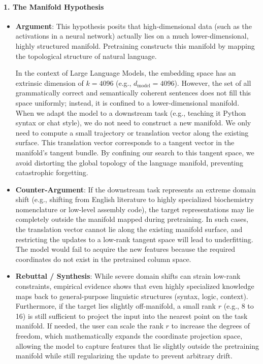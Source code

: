 \documentclass{article}
\begin{document}
\paragraph{1. The Manifold Hypothesis}
\begin{itemize}
  \item \textbf{Argument}: This hypothesis posits that high-dimensional data (such as the activations in a neural network) actually lies on a much lower-dimensional, highly structured manifold. Pretraining constructs this manifold by mapping the topological structure of natural language.
  
  In the context of Large Language Models, the embedding space has an extrinsic dimension of $k = 4096$ (e.g., $d_{\text{model}} = 4096$). However, the set of all grammatically correct and semantically coherent sentences does not fill this space uniformly; instead, it is confined to a lower-dimensional manifold. When we adapt the model to a downstream task (e.g., teaching it Python syntax or chat style), we do not need to construct a new manifold. We only need to compute a small trajectory or translation vector along the existing surface. This translation vector corresponds to a tangent vector in the manifold's tangent bundle. By confining our search to this tangent space, we avoid distorting the global topology of the language manifold, preventing catastrophic forgetting.
  
  \item \textbf{Counter-Argument}: If the downstream task represents an extreme domain shift (e.g., shifting from English literature to highly specialized biochemistry nomenclature or low-level assembly code), the target representations may lie completely outside the manifold mapped during pretraining. In such cases, the translation vector cannot lie along the existing manifold surface, and restricting the updates to a low-rank tangent space will lead to underfitting. The model would fail to acquire the new features because the required coordinates do not exist in the pretrained column space.
  
  \item \textbf{Rebuttal / Synthesis}: While severe domain shifts can strain low-rank constraints, empirical evidence shows that even highly specialized knowledge maps back to general-purpose linguistic structures (syntax, logic, context). Furthermore, if the target lies slightly off-manifold, a small rank $r$ (e.g., 8 to 16) is still sufficient to project the input into the nearest point on the task manifold. If needed, the user can scale the rank $r$ to increase the degrees of freedom, which mathematically expands the coordinate projection space, allowing the model to capture features that lie slightly outside the pretraining manifold while still regularizing the update to prevent arbitrary drift.
\end{itemize}
\end{document}
